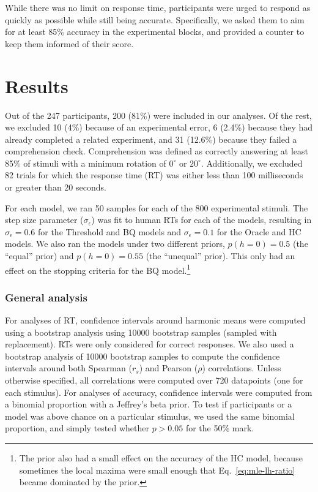 \documentclass[10pt,letterpaper]{article}
\newcommand{\Oc}[0]{Oracle}
\newcommand{\Th}[0]{Threshold}
\newcommand{\Hc}[0]{HC}
\newcommand{\Bq}[0]{BQ}
\begin{document}
While there was no limit on response time, participants were urged to
respond as quickly as possible while still being
accurate. Specifically, we asked them to aim for at least 85\%
accuracy in the experimental blocks, and provided a counter to keep
them informed of their score.

\section{Results}

Out of the 247 participants, 200 (81\%) were included in our
analyses. Of the rest, we excluded 10 (4\%) because of an experimental
error, 6 (2.4\%) because they had already completed a related
experiment, and 31 (12.6\%) because they failed a comprehension
check. Comprehension was defined as correctly answering at least 85\%
of stimuli with a minimum rotation of $0^\circ$ or $20^\circ$.
Additionally, we excluded 82 trials for which the response time (RT)
was either less than 100 milliseconds or greater than 20 seconds.

For each model, we ran 50 samples for each of the 800 experimental
stimuli. The step size parameter ($\sigma_\epsilon$) was fit to human
RTs for each of the models, resulting in $\sigma_\epsilon=0.6$ for the
\Th{} and \Bq{} models and $\sigma_\epsilon=0.1$ for the \Oc{} and
\Hc{} models. We also ran the models under two different priors,
$p(h=0)=0.5$ (the ``equal'' prior) and $p(h=0)=0.55$ (the ``unequal''
prior). This only had an effect on the stopping criteria for the \Bq{}
model.\footnote{The prior also had a small effect on the accuracy of
  the \Hc{} model, because sometimes the local maxima were small
  enough that Eq.~\ref{eq:mle-lh-ratio} became dominated by the
  prior.}

\subsubsection{General analysis}

For analyses of RT, confidence intervals around harmonic means were
computed using a bootstrap analysis using 10000 bootstrap samples
(sampled with replacement). RTs were only considered for correct
responses.  We also used a bootstrap analysis of 10000 bootstrap
samples to compute the confidence intervals around both Spearman
($r_s$) and Pearson ($\rho$) correlations.  Unless otherwise
specified, all correlations were computed over 720 datapoints (one for
each stimulus). For analyses of accuracy, confidence intervals were
computed from a binomial proportion with a Jeffrey's beta prior.  To
test if participants or a model was above chance on a particular
stimulus, we used the same binomial proportion, and simply tested
whether $p>0.05$ for the 50\% mark.
\end{document}
